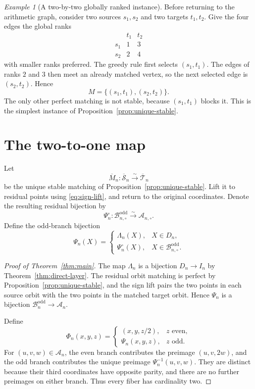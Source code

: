 \documentclass[11pt]{amsart}
\theoremstyle{definition}
\theoremstyle{remark}
\newtheorem{example}[theorem]{Example}
\newcommand{\An}{\mathcal A_n}
\newcommand{\Bodd}{\mathcal B_n^{\mathrm{odd}}}
\newcommand{\Boddres}{\mathcal B_{n,\circ}^{\mathrm{odd}}}
\newcommand{\Ares}{\mathcal A_{n,\circ}}
\newcommand{\Sbar}{\overline{\mathcal S}_n}
\newcommand{\Tbar}{\overline{\mathcal T}_n}
\begin{document}
\begin{example}[A two-by-two globally ranked instance]
\label{ex:ranked-2x2}
Before returning to the arithmetic graph, consider two sources
$s_1,s_2$ and two targets $t_1,t_2$.  Give the four edges the global ranks
\[
\begin{array}{c|cc}
 &t_1&t_2\\ \hline
s_1&1&3\\
s_2&2&4
\end{array}
\]
with smaller ranks preferred.  The greedy rule first selects $(s_1,t_1)$.
The edges of ranks $2$ and $3$ then meet an already matched vertex, so the
next selected edge is $(s_2,t_2)$.  Hence
\[
 M=\{(s_1,t_1),(s_2,t_2)\}.
\]
The only other perfect matching is not stable, because $(s_1,t_1)$ blocks it.
This is the simplest instance of Proposition~\ref{prop:unique-stable}.
\end{example}

\section{The two-to-one map}\label{sec:assembly}

Let
\[
 \overline M_n:\Sbar\xrightarrow{\sim}\Tbar
\]
be the unique stable matching of Proposition~\ref{prop:unique-stable}.  Lift it
to residual points using \eqref{eq:sign-lift}, and return to the original
coordinates.  Denote the resulting residual bijection by
\[
 \Psi_n^{\circ}:\Boddres\xrightarrow{\sim}\Ares.
\]
Define the odd-branch bijection
\[
 \Psi_n(X)=
 \begin{cases}
  \Lambda_n(X),&X\in D_n,\\
  \Psi_n^{\circ}(X),&X\in\Boddres.
 \end{cases}
\]

\begin{proof}[Proof of Theorem~\ref{thm:main}]
The map $\Lambda_n$ is a bijection $D_n\to I_n$ by
Theorem~\ref{thm:direct-layer}.  The residual orbit matching is perfect by
Proposition~\ref{prop:unique-stable}, and the sign lift pairs the two points in
each source orbit with the two points in the matched target orbit.  Hence
$\Psi_n$ is a bijection $\Bodd\to\An$.

Define
\[
 \Phi_n(x,y,z)=
 \begin{cases}
  (x,y,z/2),&z\text{ even},\\
  \Psi_n(x,y,z),&z\text{ odd}.
 \end{cases}
\]
For $(u,v,w)\in\An$, the even branch contributes the preimage $(u,v,2w)$,
and the odd branch contributes the unique preimage $\Psi_n^{-1}(u,v,w)$.
They are distinct because their third coordinates have opposite parity, and
there are no further preimages on either branch.  Thus every fiber has
cardinality two.
\end{proof}
\end{document}
